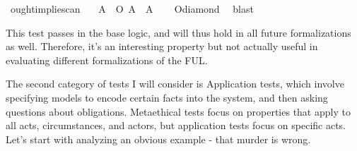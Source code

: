 \begin{isabellebody}
\begin{isamarkuptext}
\end{isamarkuptext}\isamarkuptrue%
\isamarkupfalse%
\ ought{\isacharunderscore}implies{\isacharunderscore}can{\isacharcolon}\isanewline
\ \ \ {\isachardoublequoteopen}{\isasymforall}A{\isachardot}\ {\isasymTurnstile}\ {\isacharparenleft}O\ {\isacharbraceleft}A{\isacharbraceright}\ \isactrlbold {\isasymrightarrow}\ {\isacharparenleft}{\isasymdiamond}A{\isacharparenright}{\isacharparenright}{\isachardoublequoteclose}\isanewline
%
\isadelimproof
\ \ %
\endisadelimproof
%
\isatagproof
{}\isamarkupfalse%
\ O{\isacharunderscore}diamond\ \isamarkupfalse%
\ blast%
\endisatagproof
{\isafoldproof}%
%
\isadelimproof
%
\endisadelimproof
%
\begin{isamarkuptext}%
This test passes in the base logic, and will thus hold in all future formalizations as well. 
Therefore, it's an interesting property but not actually useful in evaluating different formalizations 
of the FUL.%
\end{isamarkuptext}\isamarkuptrue%
%
\isadelimproof
%
\endisadelimproof
%
\isatagproof
%
\endisatagproof
{\isafoldproof}%
%
\isadelimproof
%
\endisadelimproof
%
\isadelimproof
%
\endisadelimproof
%
\isatagproof
%
\endisatagproof
{\isafoldproof}%
%
\isadelimproof
%
\endisadelimproof
%
\isadelimdocument
%
\endisadelimdocument
%
\isatagdocument
%
\isamarkuptrue%
%
\endisatagdocument
{\isafolddocument}%
%
\isadelimdocument
%
\endisadelimdocument
%
\begin{isamarkuptext}%
The second category of tests I will consider is Application tests, which involve specifying models
to encode certain facts into the system, and then asking questions about obligations. Metaethical tests
focus on properties that apply to all acts, circumstances, and actors, but application tests focus
on specific acts. Let's start with analyzing an obvious example - that murder is 
wrong.


\end{isamarkuptext}
\end{isabellebody}

